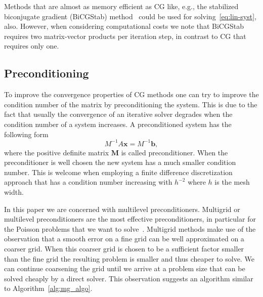 Methods that are almost as memory efficient as CG like, e.g., the
stabilized biconjugate gradient (BiCGStab) method~\cite{vors:92} could
be used for solving~\eqref{eq:lin-syst}, also.  However, when
considering computational costs we note that BiCGStab requires two
matrix-vector products per iteration step, in contrast to CG that
requires only one.

\subsection{Preconditioning}

To improve the convergence properties of CG methods one can try to
improve the condition number of the matrix by preconditioning the
system.  This is due to the fact that usually the convergence of an
iterative solver degrades when the condition number of a system
increases.  A preconditioned system has the following form
\begin{equation*}
  {M}^{-1}{A} \mathbf{x} = {M}^{-1}\mathbf{b},
\end{equation*}
where the positive definite matrix $\mathbf{M}$ is called
preconditioner.  When the preconditioner is well chosen the new system
has a much smaller condition number.  This is welcome when employing a
finite difference discretization approach that has a condition number
increasing with $h^{-2}$ where $h$ is the mesh width.

In this paper we are concerned with multilevel preconditioners.
Multigrid or multilevel preconditioners are the most effective
preconditioners, in particular for the Poisson problems that we want to
solve~\cite{hack:85,tros:00}.  Multigrid methods make use of the
observation that a smooth error on a fine grid can be well approximated
on a coarser grid.  When this coarser grid is chosen to be a sufficient
factor smaller than the fine grid the resulting problem is smaller and
thus cheaper to solve.  We can continue coarsening the grid until we
arrive at a problem size that can be solved cheaply by a direct solver.
This observation suggests an algorithm similar to
Algorithm~\ref{alg:mg_algo}.

